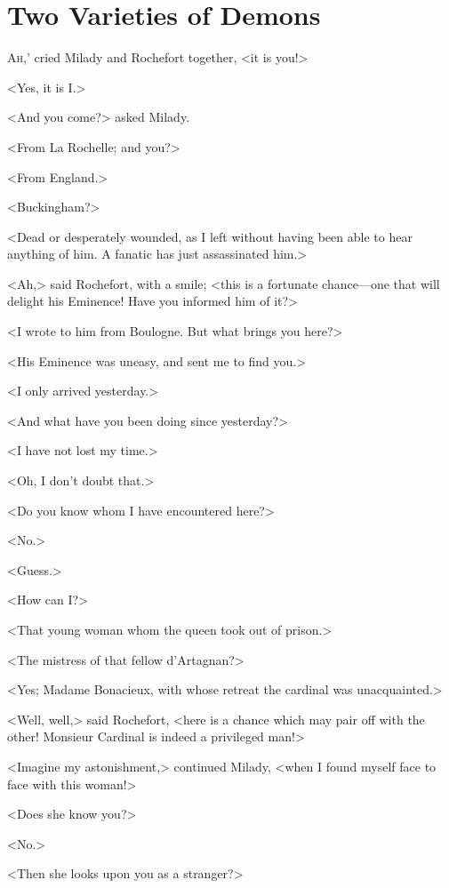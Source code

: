 
\chapter{Two Varieties of Demons}

\lettrine[,ante=`]{A}{h,}' cried Milady and Rochefort together, <it is you!> 

\zz
<Yes, it is I.> 

<And you come?> asked Milady. 

<From La Rochelle; and you?> 

<From England.> 

<Buckingham?> 

<Dead or desperately wounded, as I left without having been able to hear anything of him. A fanatic has just assassinated him.> 

<Ah,> said Rochefort, with a smile; <this is a fortunate chance---one that will delight his Eminence! Have you informed him of it?> 

<I wrote to him from Boulogne. But what brings you here?> 

<His Eminence was uneasy, and sent me to find you.> 

<I only arrived yesterday.> 

<And what have you been doing since yesterday?> 

<I have not lost my time.> 

<Oh, I don't doubt that.> 

<Do you know whom I have encountered here?> 

<No.> 

<Guess.> 

<How can I?> 

<That young woman whom the queen took out of prison.> 

<The mistress of that fellow d'Artagnan?> 

<Yes; Madame Bonacieux, with whose retreat the cardinal was unacquainted.> 

<Well, well,> said Rochefort, <here is a chance which may pair off with the other! Monsieur Cardinal is indeed a privileged man!> 

<Imagine my astonishment,> continued Milady, <when I found myself face to face with this woman!> 

<Does she know you?> 

<No.> 

<Then she looks upon you as a stranger?> 

